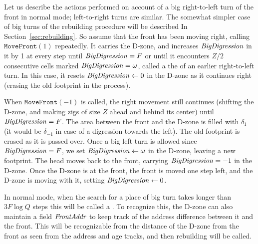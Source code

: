 \documentclass[11pt]{memoir}
\theoremstyle{definition} %
\newcommand{\fld}[1]{\ensuremath{\textit{#1\/}}}
\newcommand{\rul}[1]{\ensuremath{\texttt{#1}}}
\newcommand{\F}{F}
\newcommand{\Q}{Q} %
\newcommand{\Z}{Z} %
\newcommand{\BigDigression}{\fld{BigDigression}}
\newcommand{\FrontAddr}{\fld{FrontAddr}}
\newcommand{\Pass}{\fld{Pass}} %
\newcommand{\MoveFront}{\rul{MoveFront}}
\begin{document}
\begin{description}
Let us describe the actions performed on account of a big right-to-left turn of the front in normal mode;
left-to-right turns are similar.
The somewhat simpler case of big turns of the rebuilding procedure
will be described In Section~\ref{sec:rebuilding}.
So assume that the front has been moving right, calling \( \MoveFront(1) \) repeatedly.
It carries the D-zone, and increases \( \BigDigression \) in it
by 1 at every step until \( \BigDigression=\F \) or until it encounters \( \Z/2 \)
consecutive cells marked \( \BigDigression=\omega \), called a 
the  of an earlier right-to-left turn.
In this case, it resets \( \BigDigression\gets 0 \) in the D-zone as
it continues right (erasing the old footprint in the process).

When \( \MoveFront(-1) \) is called, the right movement still continues (shifting the D-zone, and
making zigs of size \( \Z \) ahead and behind its center) until
\( \BigDigression=\F \).
The area between the front and the D-zone is filled with \( \delta_{1} \) (it would be \( \delta_{-1} \)
in case of a digression towards the left).
The old footprint is erased as it is passed over.
Once a big left turn is allowed since \( \BigDigression=\F \),
we set \( \BigDigression\gets \omega \) in the D-zone, leaving a new footprint.
The head moves back to the front, carrying \( \BigDigression=-1 \)
in the D-zone.
Once the D-zone is at the front,
the front is moved one step left, and the D-zone is moving with it,
setting \( \BigDigression\gets 0 \).


In normal mode, when the search for a place of big turn takes longer than \( 3\F\log\Q \) steps
this will be called a .
To recognize this, the D-zone can also maintain a field \( \FrontAddr \) to keep track of the
address difference between it and the front.
This will be recognizable from the distance of the D-zone from the front as seen from the address
and age tracks, and then rebuilding will be called.
\end{description}
\end{document}
